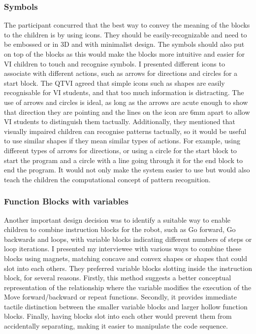 \documentclass[oneside,%
                    author={Malak Hajji},
                    degree={BSc},
                    title={Designing An Accessible Computational Toolkit For Students},
                  subtitle={With Mixed Visual Abilities}]{dissertation}
\begin{document}
\subsubsection{Symbols}
The participant concurred that the best way to convey the meaning of the blocks to the children is by using icons. They should be easily-recognizable and need to be embossed or in 3D and with minimalist design. The symbols should also put on top of the blocks as this would make the blocks more intuitive and easier for VI children to touch and recognise symbols.
I presented different icons to associate with different actions, such as arrows for directions and circles for a start block. The QTVI agreed that simple icons such as shapes are easily recognisable for VI students, and that too much information is distracting. The use of arrows and circles is ideal, as long as the arrows are acute enough to show that direction they are pointing and the lines on the icon are 6mm apart to allow VI students to distinguish them tactually. Additionally, they mentioned that visually impaired children can recognise patterns tactually, so it would be useful to use similar shapes if they mean similar types of actions. For example, using different types of arrows for directions, or using a circle for the start block to start the program and a circle with a line going through it for the end block to end the program. It would not only make the system easier to use but would also teach the children the computational concept of pattern recognition.
\subsubsection{Function Blocks with variables}
Another important design decision was to identify a suitable way to enable children to combine instruction blocks for the robot, such as Go forward, Go backwards and loops, with variable blocks indicating different numbers of steps or loop iterations. I presented my interviewee with various ways to combine these blocks using magnets, matching concave and convex shapes or shapes that could slot into each others. They preferred variable blocks slotting inside the instruction block, for several reasons. Firstly, this method suggests a better conceptual representation of the relationship where the variable modifies the execution of the Move forward/backward or repeat functions. Secondly, it provides immediate tactile distinction between the smaller variable blocks and larger hollow function blocks. Finally, having blocks slot into each other would prevent them from accidentally separating, making it easier to manipulate the code sequence.
\end{document}
